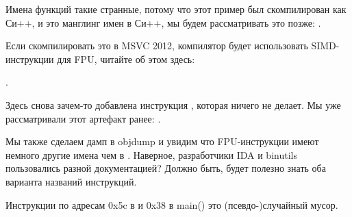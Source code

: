 Имена функций такие странные, потому что этот пример был скомпилирован как Си++, и это манглинг имен в Си++, мы будем рассматривать это позже: .

Если скомпилировать это в MSVC 2012, компилятор будет использовать SIMD-инструкции для FPU, читайте об этом здесь:

.




Здесь снова зачем-то добавлена инструкция , которая ничего не делает.
Мы уже рассматривали этот артефакт ранее: .




Мы также сделаем дамп в objdump и увидим что FPU-инструкции имеют немного другие имена чем в \IDA.
Наверное, разработчики IDA и binutils пользовались разной документацией?
Должно быть, будет полезно знать оба варианта названий инструкций.



Инструкции по адресам 0x5c в  и 0x38 в main() это (псевдо-)случайный мусор.

